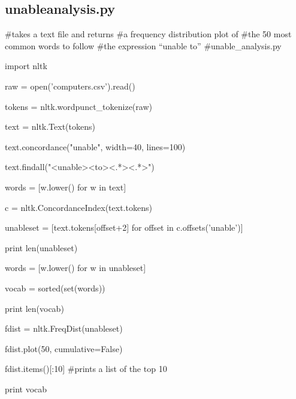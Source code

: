 \subsection{unableanalysis.py}
\label{unable_analysis.py}
\begin{pyverbatim}
#takes a text file and returns
#a frequency distribution plot of
#the 50 most common words to follow
#the expression ``unable to''
#unable_analysis.py

import nltk

raw = open('computers.csv').read()

tokens = nltk.wordpunct_tokenize(raw)

text = nltk.Text(tokens)

text.concordance("unable", width=40, lines=100)

text.findall("<unable><to><.*><.*>")

words = [w.lower() for w in text]

c = nltk.ConcordanceIndex(text.tokens)

unableset = [text.tokens[offset+2] for offset in c.offsets('unable')]

print len(unableset)

words = [w.lower() for w in unableset]

vocab = sorted(set(words))

print len(vocab)

fdist = nltk.FreqDist(unableset)

fdist.plot(50, cumulative=False)

fdist.items()[:10] #prints a list of the top 10

print vocab


\end{pyverbatim}

